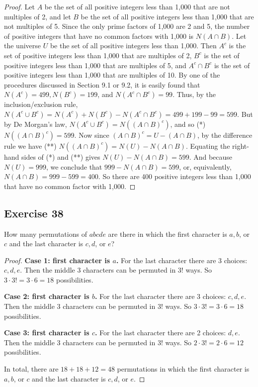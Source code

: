 \documentclass[14pt]{extarticle}
\begin{document}
\begin{proof}
Let $A$ be the set of all positive integers less than 1,000 that are not multiples of 2, and let $B$ be the set of all 
positive integers less than 1,000 that are not multiples of 5. Since the only prime factors of 1,000 are 2 and 5, the 
number of positive integers that have no common factors with 1,000 is \(N(A \cap B)\). Let the universe $U$ be the 
set of all positive integers less than 1,000. Then \(A^c\) is the set of positive integers less than 1,000 that are 
multiples of 2, \(B^c\) is the set of positive integers less than 1,000 that are multiples of 5, and \(A^c \cap 
B^c\) is the set of positive integers less than 1,000 that are multiples of 10. By one of the procedures discussed in 
Section 9.1 or 9.2, it is easily found that \(N(A^c) = 499, N(B^c) = 199\), and \(N(A^c \cap B^c) = 99\). Thus, by the 
inclusion/exclusion rule, \(N(A^c \cup B^c) = N(A^c) + N(B^c) - N(A^c \cap B^c) = 499 + 199 - 99 = 599\). But by 
De Morgan’s law, \(N(A^c \cup B^c) = N((A \cap B)^c)\), and so (*) \(N((A \cap B)^c) = 599\). Now since \((A \cap B)^c 
= U - (A \cap B)\), by the difference rule we have (**) \(N((A \cap B)^c) = N(U) - N(A \cap B)\). Equating the 
right-hand sides of (*) and (**) gives \(N(U) - N(A \cap B) = 599\). And because \(N(U) = 999\), we conclude that \(999 
- N(A \cap B) = 599\), or, equivalently, \(N(A \cap B) = 999 - 599 = 400\). So there are 400 positive integers less 
than 1,000 that have no common factor with 1,000.
\end{proof}

\subsection{Exercise 38}
How many permutations of \(abcde\) are there in which the first character is \(a, b\), or $c$ and the last character is \(c, d\), or $e$?

\begin{proof}
{\bf Case 1: first character is $a$.} For the last character there are 3 choices: \(c, d, e\). Then the middle
3 characters can be permuted in \(3!\) ways. So \(3 \cdot 3! = 3 \cdot 6 = 18\) possibilities.

{\bf Case 2: first character is $b$.} For the last character there are 3 choices: \(c, d, e\). Then the middle
3 characters can be permuted in \(3!\) ways. So \(3 \cdot 3! = 3 \cdot 6 = 18\) possibilities.

{\bf Case 3: first character is $c$.} For the last character there are 2 choices: \(d, e\). Then the middle
3 characters can be permuted in \(3!\) ways. So \(2 \cdot 3! = 2 \cdot 6 = 12\) possibilities.

In total, there are \(18+18+12 = 48\) permutations in which the first character is \(a, b\), or $c$ and the last 
character is \(c, d\), or $e$.
\end{proof}
\end{document}
